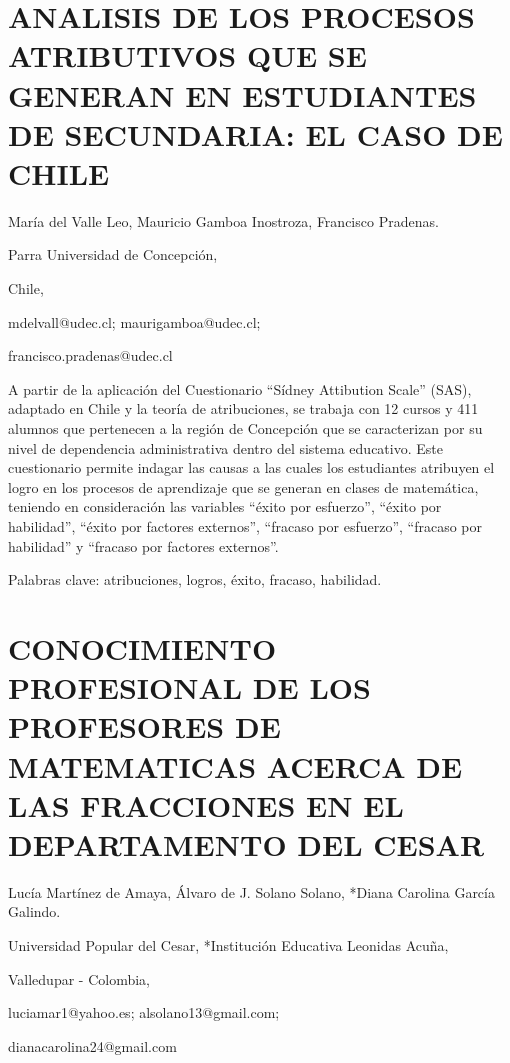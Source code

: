 \section{ANALISIS DE LOS PROCESOS ATRIBUTIVOS QUE SE GENERAN EN ESTUDIANTES
DE SECUNDARIA: EL CASO DE CHILE}

\begin{datos}

María del Valle Leo, Mauricio Gamboa Inostroza, Francisco Pradenas.

Parra Universidad de Concepción, 

Chile,

mdelvall@udec.cl; maurigamboa@udec.cl;

francisco.pradenas@udec.cl

\end{datos}

A partir de la aplicación del Cuestionario “Sídney Attibution Scale”
(SAS), adaptado en Chile y la teoría de atribuciones, se trabaja con
12 cursos y 411 alumnos que pertenecen a la región de Concepción que
se caracterizan por su nivel de dependencia administrativa dentro
del sistema educativo. Este cuestionario permite indagar las causas
a las cuales los estudiantes atribuyen el logro en los procesos de
aprendizaje que se generan en clases de matemática, teniendo en consideración
las variables “éxito por esfuerzo”, “éxito por habilidad”, “éxito
por factores externos”, “fracaso por esfuerzo”, “fracaso por habilidad”
y “fracaso por factores externos”.

Palabras clave: atribuciones, logros, éxito, fracaso, habilidad.


\section{CONOCIMIENTO PROFESIONAL DE LOS PROFESORES DE MATEMATICAS ACERCA
DE LAS FRACCIONES EN EL DEPARTAMENTO DEL CESAR}

\begin{datos}

Lucía Martínez de Amaya, Álvaro de J. Solano Solano, {*}Diana Carolina
García Galindo.

Universidad Popular del Cesar, {*}Institución Educativa Leonidas Acuña,

Valledupar - Colombia,

luciamar1@yahoo.es; alsolano13@gmail.com;

dianacarolina24@gmail.com 

\end{datos}

